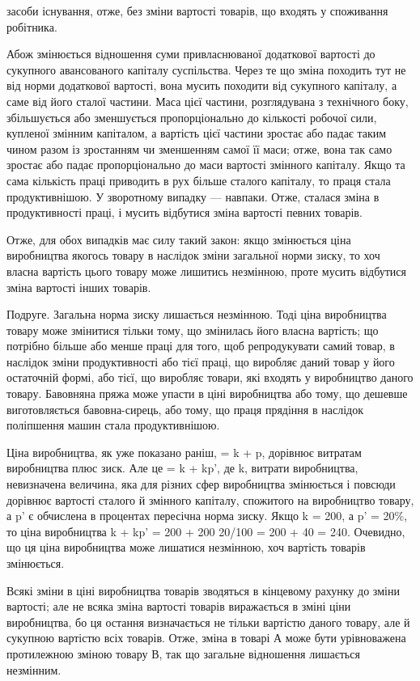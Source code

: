 \parcont{}  %
засоби існування, отже, без зміни вартості товарів, що входять у споживання робітника.

Абож змінюється відношення суми привласнюваної додаткової вартості до сукупного авансованого
капіталу суспільства. Через те що зміна походить тут не від норми додаткової вартості, вона мусить
походити від сукупного капіталу, а саме від його сталої частини. Маса цієї частини, розглядувана з
технічного боку, збільшується або зменшується пропорціонально до кількості робочої сили, купленої
змінним капіталом, а вартість цієї частини зростає або падає таким чином разом із зростанням чи
зменшенням самої її маси; отже, вона так само зростає або падає пропорціонально до маси вартості
змінного капіталу. Якщо та сама кількість праці приводить в рух більше сталого капіталу, то праця
стала продуктивнішою. У зворотному випадку — навпаки. Отже, сталася зміна в продуктивності праці, і
мусить відбутися зміна вартості певних товарів.

Отже, для обох випадків має силу такий закон: якщо змінюється ціна виробництва якогось товару в
наслідок зміни загальної норми зиску, то хоч власна вартість цього товару може лишитись незмінною,
проте мусить відбутися зміна вартості інших товарів.

 Подруге. Загальна норма зиску лишається незмінною. Тоді ціна виробництва товару може змінитися
тільки тому, що змінилась його власна вартість; що потрібно більше або менше праці для того, щоб
репродукувати самий товар, в наслідок зміни продуктивності або тієї праці, що виробляє даний товар у
його остаточній формі, або тієї, що виробляє товари, які входять у виробництво даного товару.
Бавовняна пряжа може упасти в ціні виробництва або тому, що дешевше виготовляється бавовна-сирець,
або тому, що праця прядіння в наслідок поліпшення машин стала продуктивнішою.

Ціна виробництва, як уже показано раніш, = k + p, дорівнює витратам виробництва плюс зиск. Але це =
k + kp', де k, витрати виробництва, невизначена величина, яка для різних сфер виробництва змінюється
і повсюди дорівнює вартості сталого й змінного капіталу, спожитого на виробництво товару, а p' є
обчислена в процентах пересічна норма зиску. Якщо k = 200, а p' = 20\%, то ціна виробництва k + kp' =
200 + 200 20/100 = 200
+ 40 = 240. Очевидно, що ця ціна виробництва може лишатися незмінною, хоч вартість товарів
змінюється.

Всякі зміни в ціні виробництва товарів зводяться в кінцевому рахунку до зміни вартості; але не всяка
зміна вартості товарів виражається в зміні ціни виробництва, бо ця остання визначається не тільки
вартістю даного товару, але й сукупною вартістю всіх товарів. Отже, зміна в товарі А може бути
урівноважена протилежною зміною товару В, так що загальне відношення лишається незмінним.
